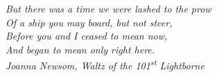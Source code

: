 \begin{epi}
    \itshape
    \vspace*{5\baselineskip}
    But there was a time we were lashed to the prow \\
    Of a ship you may board, but not steer, \\
    Before you and I ceased to mean now, \\
    And began to mean only right here. \\

    \vspace{\baselineskip}
    \emph{Joanna Newsom, \emph{Waltz of the 101\textsuperscript{st} Lightborne}}
\end{epi}

\mainmatter
